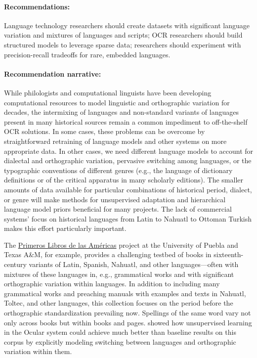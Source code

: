 \documentclass[twoside,11pt]{report}
\begin{document}
\paragraph{Recommendations:} Language technology researchers should create datasets with significant language variation and mixtures of languages and scripts; OCR researchers should build structured models to leverage sparse data; researchers should experiment with precision-recall tradeoffs for rare, embedded languages.

\paragraph{Recommendation narrative:}

While philologists and computational linguists have been developing computational resources to model linguistic and orthographic variation for decades, the intermixing of languages and non-standard variants of languages present in many historical sources remain a common impediment to off-the-shelf OCR solutions. In some cases, these problems can be overcome by straightforward retraining of language models and other systems on more appropriate data. In other cases, we need different language models to account for dialectal and orthographic variation, pervasive switching among languages, or the typographic conventions of different genres (e.g., the language of dictionary definitions or of the critical apparatus in many scholarly editions). The smaller amounts of data available for particular combinations of historical period, dialect, or genre will make methods for unsupervised adaptation and hierarchical language model priors beneficial for many projects. The lack of commercial systems' focus on historical languages from Latin to Nahuatl to Ottoman Turkish makes this effort particularly important.

The \href{http://primeroslibros.org/}{Primeros Libros de las Américas} project at the University of Puebla and Texas A\&M, for example, provides a challenging testbed of books in sixteenth-century variants of Latin, Spanish, Nahuatl, and other languages---often with mixtures of these languages in, e.g., grammatical works and with significant orthographic variation within languages. In addition to including many grammatical works and preaching manuals with examples and texts in Nahuatl, Toltec, and other languages, this collection focuses on the period before the orthographic standardization prevailing now. Spellings of the same word vary not only across books but within books and pages. \cite{garrette15:_unsup_code_switc_multil_histor_docum_trans} showed how unsupervised learning in the Ocular system could achieve much better than baseline results on this corpus by explicitly modeling switching between languages and orthographic variation within them.
\end{document}
